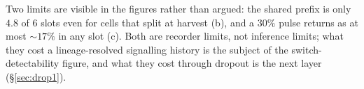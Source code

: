Two limits are visible in the figures rather than argued: the shared prefix is only $4.8$ of 6 slots
even for cells that split at harvest (b), and a $30\%$ pulse returns as at most $\sim17\%$ in any slot
(c). Both are recorder limits, not inference limits; what they cost a lineage-resolved signalling
history is the subject of the switch-detectability figure, and what they cost through dropout is the
next layer (\S\ref{sec:drop1}).
